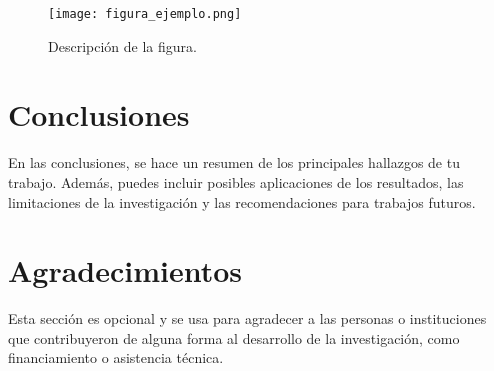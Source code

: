 \documentclass[conference, a4paper]{IEEEtran}
\begin{document}
\begin{figure}[htbp]
\centerline{\texttt{[image: figura\_ejemplo.png]}}
\caption{Descripción de la figura.}
\label{figura1}
\end{figure}

\section{Conclusiones}
En las conclusiones, se hace un resumen de los principales hallazgos de tu trabajo. Además, puedes incluir posibles aplicaciones de los resultados, las limitaciones de la investigación y las recomendaciones para trabajos futuros.

\section*{Agradecimientos}
Esta sección es opcional y se usa para agradecer a las personas o instituciones que contribuyeron de alguna forma al desarrollo de la investigación, como financiamiento o asistencia técnica.



\end{document}
